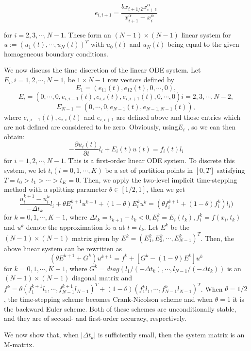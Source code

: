 \documentclass{article}
\begin{document}
\begin{equation}
e_{i,i+1} = \frac{bx_{i+1/2}x_{i+1}^{\alpha}}{x_{i+1}^{\alpha}-x_{i}^{\alpha}}
\end{equation}

for $i = 2,3,\cdots,N-1$. These form an $(N-1)\times(N-1)$ linear system for $u := (u_1(t), \cdots, u_N(t))^T$ with $u_0(t)$ and $u_N(t)$ being equal to the given homogeneous boundary conditions.

We now discuss the time discretion of the linear ODE system. Let $E_i, i = 1, 2, \cdots, N-1$, be $1\times N-1$ row vectors defined by 
$$
E_1 = (e_{11}(t), e_{12}(t),0,\cdots,0),
$$
$$
E_i = (0,\cdots,0,e_{i,i-1}(t), e_{i,i}(t),e_{i,i+1}(t),0,\cdots,0) i = 2,3,\cdots, N-2,
$$
$$
E_{N-1} = (0,\cdots,0,e_{N-1}(t), e_{N-1,N-1}(t)),
$$
where $e_{i,i-1}(t), e_{i,i}(t)$ and $e_{i,i+1}$ are defined above and those entries which are not defined are considered to be zero. Obviously, using$E_i$ , so we can then obtain:
$$
-\frac{\partial u_i(t)}{\partial t}l_i + E_i(t)u(t) = f_i(t)l_i
$$
for $i = 1, 2, \cdots, N-1$. This is a first-order linear ODE system. To discrete this system, we let $t_i(i = 0,1,\cdots,K)$ be a set of partition points in $[0,T]$ satisfying $T = t_0 > t_1> \cdots >t_K = 0$. Then, we apply the two-level implicit time-stepping method with a splitting parameter $\theta \in [1/2, 1]$, then we get
$$
\frac{u_i^{k+1}- u_i^k}{-\Delta t_k}l_i + \theta E_i^{k+1}u^{k+1} + (1-\theta)E_i^k u^k = (\theta f_i^{k+1} + (1-\theta)f_i^k)l_i)
$$
for $k = 0,1, \cdots, K-1$, where $\Delta t_k = t_{k+1} - t_k < 0, E_i^k = E_i(t_k), f_i^k = f(x_i, t_k)$ and $u^k$ denote the approximation fo $u$ at $t = t_k$. Let $E^k$ be the $(N-1)\times(N-1)$ matrix given by $E^k = (E_1^k, E_2^k, \cdots, E_{N-1}^k)^T$. Then, the above linear system can be rewritten as 
\begin{equation}
(\theta E^{k+1} + G^k)u^{k+1} = f^k + [G^k - (1 - \theta)E^k]u^k
\end{equation}
for $k = 0, 1, \cdots , K-1$, where $G^k = diag(l_1/(-\Delta t_k), \cdots, l_{N-1}/(-\Delta t_k))$ is an $(N-1) \times (N-1)$ diagonal matrix and $f^k =\theta(f_1^{k+1}l_1, \cdots, f_{N-1}^{k+1}l_{N-1})^T + (1-\theta)(f_1^kl_1, \cdots, f_{N-1}^kl_{N-1})^T$. When $\theta = 1/2$, the time-stepping scheme becomes Crank-Nicolson scheme and when $\theta = 1$ it is the backward Euler scheme. Both of these schemes are unconditionally stable, and they are of second- and first-order accuracy, respectively.

We now show that, when $|\Delta t_k|$ is sufficiently small, then the system matrix is an M-matrix.
\end{document}
